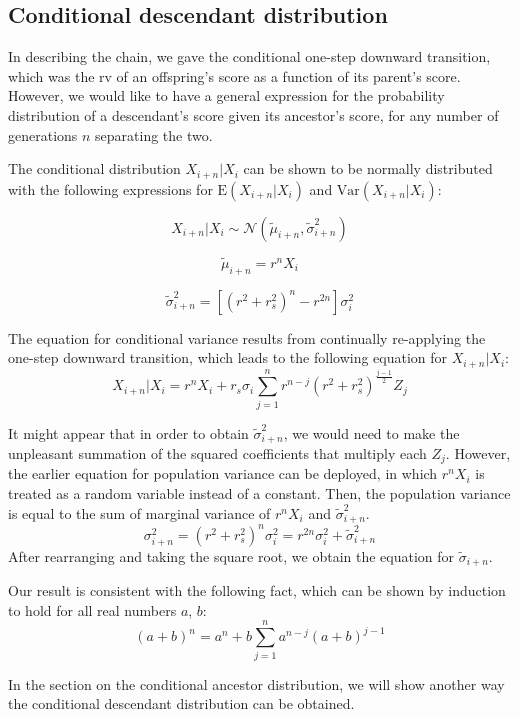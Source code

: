 \documentclass[letterpaper,10pt]{article} %
\begin{document}
\subsection{Conditional descendant distribution}

In describing the chain, we gave the conditional one-step downward transition, which was the rv of an offspring's score as a function of its parent's score. However, we would like to have a general expression for the probability distribution of  a descendant's score given its ancestor's score, for any number of generations $n$ separating the two. 

The conditional distribution $X_{i+n}|X_i$ can be shown to be normally distributed with the following expressions for $\mathrm{E}(X_{i+n}|X_i)$ and $\mathrm{Var}(X_{i+n}|X_i)$:

$$X_{i+n}|X_i \sim \mathcal{N}( \tilde{\mu}_{i+n}, \tilde{\sigma}_{i+n}^2)$$

$$\tilde{\mu}_{i+n} = r^nX_i$$

$$\tilde{\sigma}_{i+n}^2 = [(r^2+r_s^2)^n-r^{2n}] \sigma_i^2$$

The equation for conditional variance results from continually re-applying the one-step downward transition, which leads to the following equation for $X_{i+n}|X_i$:
$$X_{i+n}|X_i = r^nX_i + r_s\sigma_i \sum_{j=1}^{n}r^{n-j}(r^2+r_s^2)^{\frac{j-1}{2}}Z_j$$

It might appear that in order to obtain $\tilde{\sigma}_{i+n}^2$, we would need to make the unpleasant summation of the squared coefficients that multiply each $Z_j$. However, the earlier equation for population variance can be deployed, in which $r^nX_i$ is treated as a random variable instead of a constant. Then, the population variance is equal to the sum of marginal variance of $r^nX_i$ and $\tilde{\sigma}_{i+n}^2$.
%
$$\sigma_{i+n}^2 =  (r^2+r_s^2)^n  \sigma_{i}^2 =  r^{2n}\sigma_i^2 + \tilde{\sigma}_{i+n}^2$$
%
After rearranging and taking the square root, we obtain the equation for $\tilde{\sigma}_{i+n}$.

Our result is consistent with the following fact, which can be shown by induction to hold for all real numbers $a$,  $b$:
$$(a+b)^n = a^n + b \sum_{j=1}^{n}a^{n-j}(a+b)^{j-1}$$

In the section on the conditional ancestor distribution, we will show another way the conditional descendant distribution can be obtained.




\end{document}
